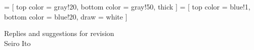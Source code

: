 

\renewcommand\Routcolor{\color{gray30}}
\newtheorem{finding}{Finding}[section]
\makeatletter
\g@addto@macro{\UrlBreaks}{\UrlOrds}
\newcommand\gobblepars{%
    \@ifnextchar\par%
        {\expandafter\gobblepars\@gobble}%
        {}}
\newenvironment{lightgrayleftbar}{%
  \def\FrameCommand{\textcolor{lightgray}{\vrule width 1zw} \hspace{10pt}}%
  \MakeFramed {\advance\hsize-\width \FrameRestore}}%
{\endMakeFramed}
\newenvironment{palepinkleftbar}{%
  \def\FrameCommand{\textcolor{palepink}{\vrule width 1zw} \hspace{10pt}}%
  \MakeFramed {\advance\hsize-\width \FrameRestore}}%
{\endMakeFramed}
\makeatother
\usepackage{caption}
\usepackage{setspace}
\usepackage{framed}
\def\pgfsysdriver{pgfsys-dvipdfm.def}
\usepackage{tikz}
\usetikzlibrary{calc, arrows, decorations, decorations.pathreplacing, backgrounds}
\usepackage{adjustbox}
 =
[
top color = gray!20, bottom color = gray!50, thick
]
 =
[
top color = blue!1, bottom color = blue!20, draw = white
]



\setlength{\baselineskip}{12pt}

Replies and suggestions for revision \hfill \MonthDY\\
Seiro Ito






\vspace{2ex}

